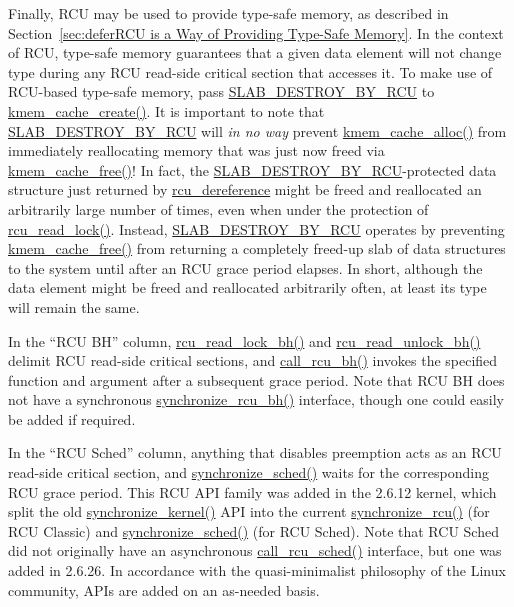 Finally, RCU may be used to provide
type-safe memory, as described in
Section~\ref{sec:deferRCU is a Way of Providing Type-Safe Memory}.
In the context of RCU, type-safe memory guarantees that a given
data element will not change type during any RCU read-side critical section
that accesses it.
To make use of RCU-based type-safe memory, pass
\url{SLAB_DESTROY_BY_RCU} to
\url{kmem_cache_create()}.
It is important to note that \url{SLAB_DESTROY_BY_RCU} will
\emph{in no way}
prevent \url{kmem_cache_alloc()} from immediately reallocating
memory that was just now freed via \url{kmem_cache_free()}!
In fact, the \url{SLAB_DESTROY_BY_RCU}-protected data structure
just returned by \url{rcu_dereference} might be freed and reallocated
an arbitrarily large number of times, even when under the protection
of \url{rcu_read_lock()}.
Instead, \url{SLAB_DESTROY_BY_RCU} operates by preventing
\url{kmem_cache_free()}
from returning a completely freed-up slab of data structures
to the system until after an RCU grace period elapses.
In short, although the data element might be freed and reallocated arbitrarily
often, at least its type will remain the same.

In the ``RCU BH'' column, \url{rcu_read_lock_bh()} and
\url{rcu_read_unlock_bh()} delimit RCU read-side critical
sections, and \url{call_rcu_bh()} invokes the specified
function and argument after a subsequent grace period.
Note that RCU BH does not have a synchronous \url{synchronize_rcu_bh()}
interface,
though one could easily be added if required.

 \QuickQuizEnd

In the ``RCU Sched'' column, anything that disables preemption
acts as an RCU read-side critical section, and \url{synchronize_sched()}
waits for the corresponding RCU grace period.
This RCU API family was added in the 2.6.12 kernel, which split the
old \url{synchronize_kernel()} API into the current
\url{synchronize_rcu()} (for RCU Classic) and
\url{synchronize_sched()} (for RCU Sched).
Note that RCU Sched did not originally have an asynchronous
\url{call_rcu_sched()} interface, but one was added in 2.6.26.
In accordance with the quasi-minimalist philosophy of the Linux
community, APIs are added on an as-needed basis.


